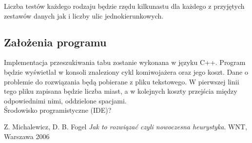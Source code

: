 \documentclass[11pt,a4paper,twoside]{article}
\begin{document}
Liczba testów każdego rodzaju będzie rzędu kilkunastu dla każdego z przyjętych zestawów danych jak i liczby ulic jednokierunkowych.
\subsection{Założenia programu}
Implementacja przeszukiwania tabu zostanie wykonana w języku C++. Program będzie wyświetlał w konsoli znaleziony cykl komiwojażera oraz jego koszt. Dane o problemie do rozwiązania będą pobierane z pliku tekstowego. W pierwszej linii tego pliku zapisana będzie liczba miast, a w kolejnych koszty przejścia między odpowiednimi nimi, oddzielone spacjami.
\\

Środowisko programistyczne (IDE)?
 
\begin{thebibliography}{9}
Z. Michalewicz, D. B. Fogel
\emph{Jak to rozwiązać czyli nowoczesna heurystyka}.
WNT, Warszawa 2006
\end{thebibliography}
\end{document}

